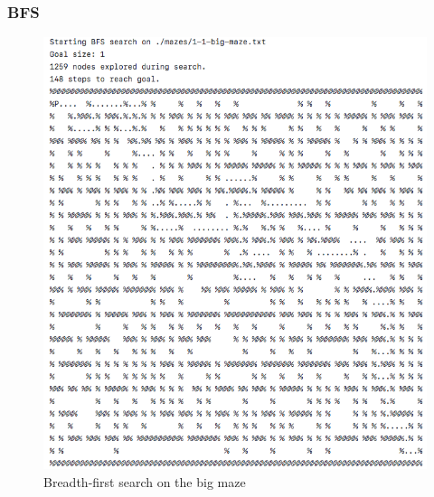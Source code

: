 \documentclass[titlepage]{article}
\begin{document}
\subsubsection*{BFS}
\begin{figure}[h!]
\includegraphics[width=\linewidth]{bfsbig.png}
\caption{Breadth-first search on the big maze}
\label{fig:BFSbig}
\end{figure}

\newpage
\end{document}
